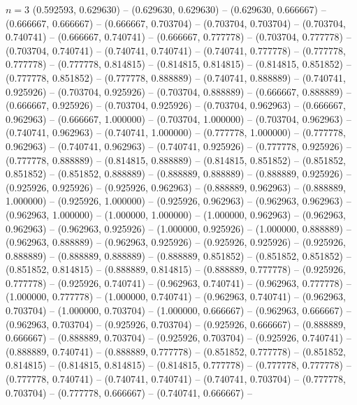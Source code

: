 \begin{zzfrac}{$n = 3$}
  (0.592593, 0.629630) --
  (0.629630, 0.629630) --
  (0.629630, 0.666667) --
  (0.666667, 0.666667) --
  (0.666667, 0.703704) --
  (0.703704, 0.703704) --
  (0.703704, 0.740741) --
  (0.666667, 0.740741) --
  (0.666667, 0.777778) --
  (0.703704, 0.777778) --
  (0.703704, 0.740741) --
  (0.740741, 0.740741) --
  (0.740741, 0.777778) --
  (0.777778, 0.777778) --
  (0.777778, 0.814815) --
  (0.814815, 0.814815) --
  (0.814815, 0.851852) --
  (0.777778, 0.851852) --
  (0.777778, 0.888889) --
  (0.740741, 0.888889) --
  (0.740741, 0.925926) --
  (0.703704, 0.925926) --
  (0.703704, 0.888889) --
  (0.666667, 0.888889) --
  (0.666667, 0.925926) --
  (0.703704, 0.925926) --
  (0.703704, 0.962963) --
  (0.666667, 0.962963) --
  (0.666667, 1.000000) --
  (0.703704, 1.000000) --
  (0.703704, 0.962963) --
  (0.740741, 0.962963) --
  (0.740741, 1.000000) --
  (0.777778, 1.000000) --
  (0.777778, 0.962963) --
  (0.740741, 0.962963) --
  (0.740741, 0.925926) --
  (0.777778, 0.925926) --
  (0.777778, 0.888889) --
  (0.814815, 0.888889) --
  (0.814815, 0.851852) --
  (0.851852, 0.851852) --
  (0.851852, 0.888889) --
  (0.888889, 0.888889) --
  (0.888889, 0.925926) --
  (0.925926, 0.925926) --
  (0.925926, 0.962963) --
  (0.888889, 0.962963) --
  (0.888889, 1.000000) --
  (0.925926, 1.000000) --
  (0.925926, 0.962963) --
  (0.962963, 0.962963) --
  (0.962963, 1.000000) --
  (1.000000, 1.000000) --
  (1.000000, 0.962963) --
  (0.962963, 0.962963) --
  (0.962963, 0.925926) --
  (1.000000, 0.925926) --
  (1.000000, 0.888889) --
  (0.962963, 0.888889) --
  (0.962963, 0.925926) --
  (0.925926, 0.925926) --
  (0.925926, 0.888889) --
  (0.888889, 0.888889) --
  (0.888889, 0.851852) --
  (0.851852, 0.851852) --
  (0.851852, 0.814815) --
  (0.888889, 0.814815) --
  (0.888889, 0.777778) --
  (0.925926, 0.777778) --
  (0.925926, 0.740741) --
  (0.962963, 0.740741) --
  (0.962963, 0.777778) --
  (1.000000, 0.777778) --
  (1.000000, 0.740741) --
  (0.962963, 0.740741) --
  (0.962963, 0.703704) --
  (1.000000, 0.703704) --
  (1.000000, 0.666667) --
  (0.962963, 0.666667) --
  (0.962963, 0.703704) --
  (0.925926, 0.703704) --
  (0.925926, 0.666667) --
  (0.888889, 0.666667) --
  (0.888889, 0.703704) --
  (0.925926, 0.703704) --
  (0.925926, 0.740741) --
  (0.888889, 0.740741) --
  (0.888889, 0.777778) --
  (0.851852, 0.777778) --
  (0.851852, 0.814815) --
  (0.814815, 0.814815) --
  (0.814815, 0.777778) --
  (0.777778, 0.777778) --
  (0.777778, 0.740741) --
  (0.740741, 0.740741) --
  (0.740741, 0.703704) --
  (0.777778, 0.703704) --
  (0.777778, 0.666667) --
  (0.740741, 0.666667) --

\end{zzfrac}
